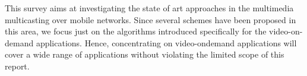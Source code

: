 This survey aims at investigating the state of art approaches in the multimedia multicasting over mobile networks. Since several schemes have been proposed in this area, we focus just on the algorithms introduced specifically for the video-on-demand applications. Hence, concentrating on video-ondemand applications will cover a wide range of applications without violating the limited scope of this report.